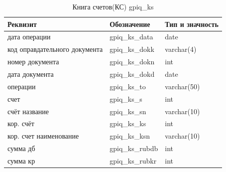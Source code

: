 \begin{table}[h!p]
    \centering
    \scriptsize
    \caption{Книга счетов(КС) gpiq\_ks}
    \begin{tabular}{|l|l|l|} 

                                                                                   \hline
\textbf{Реквизит}               &\textbf{Обозначение}   &\textbf{Тип и значность}   \\ \hline
дата операции                   &gpiq\_ks\_data         &date                       \\ \hline
код оправдательного документа   &gpiq\_ks\_dokk         &varchar(4)                 \\ \hline
номер документа                 &gpiq\_ks\_dokn         &int                        \\ \hline
дата документа                  &gpiq\_ks\_dokd         &date                       \\ \hline
операции                        &gpiq\_ks\_to           &varchar(50)                \\ \hline
счет                            &gpiq\_ks\_s            &int                        \\ \hline
счёт название                   &gpiq\_ks\_sn           &varchar(10)                \\ \hline
кор. счёт                       &gpiq\_ks\_ks           &int                        \\ \hline
кор. счет наименование          &gpiq\_ks\_ksn          &varchar(10)                \\ \hline
сумма дб                        &gpiq\_ks\_rubdb        &int                        \\ \hline
сумма кр                        &gpiq\_ks\_rubkr        &int                        \\ \hline

    \end{tabular}
\end{table}


